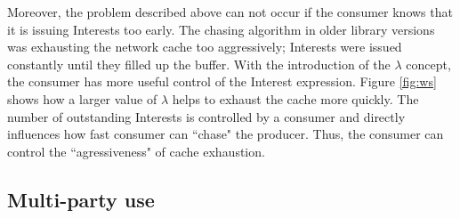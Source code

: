 \documentclass{icn/sig-alternate-2013} %
\begin{document}
Moreover, the problem described above can not occur if the consumer knows that it is issuing Interests too early. The chasing algorithm in older library versions was exhausting the network cache too aggressively; Interests were issued constantly until they filled up the buffer.  With the introduction of the $\lambda$ concept, the consumer has more useful control of the Interest expression. Figure \ref{fig:ws} shows how a larger value of $\lambda$ helps to exhaust the cache more quickly. The number of outstanding Interests is controlled by a consumer and directly influences how fast consumer can ``chase" the producer. Thus, the consumer can control the ``agressiveness" of cache exhaustion.






\subsection{Multi-party use}
\end{document}
